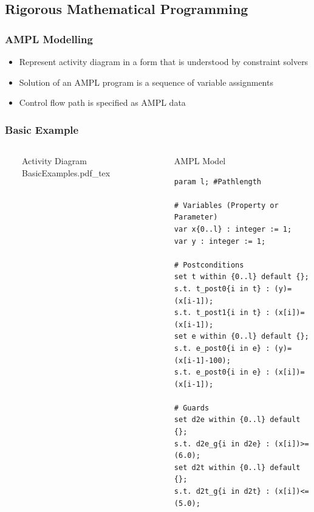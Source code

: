 \documentclass{beamer}
\begin{document}
\subsection{Rigorous Mathematical Programming}
\begin{frame}
\frametitle{AMPL Modelling \cite{AMPL}}
\begin{itemize}
  \item Represent activity diagram in a form that is understood by constraint solvers
  \item Solution of an AMPL program is a sequence of variable assignments
  \item Control flow path is specified as AMPL data
\end{itemize}
\end{frame}
\begin{frame}[fragile]
\frametitle{Basic Example}
\begin{columns}
  \ 
	\begin{block}{Activity Diagram} 
	\def\svgwidth{\textwidth}
	\scriptsize
	{BasicExamples.pdf_tex}
	\end{block} 
\column{.56\textwidth} \ 
	\begin{block}{AMPL Model} 
		\begin{lstlisting}[basicstyle=\ttfamily\scriptsize,language=ampl]
param l; #Pathlength

# Variables (Property or Parameter)
var x{0..l} : integer := 1;
var y : integer := 1;

# Postconditions
set t within {0..l} default {};
s.t. t_post0{i in t} : (y)=(x[i-1]);
s.t. t_post1{i in t} : (x[i])=(x[i-1]);
set e within {0..l} default {};
s.t. e_post0{i in e} : (y)=(x[i-1]-100);
s.t. e_post0{i in e} : (x[i])=(x[i-1]);

# Guards
set d2e within {0..l} default {};
s.t. d2e_g{i in d2e} : (x[i])>=(6.0);
set d2t within {0..l} default {};
s.t. d2t_g{i in d2t} : (x[i])<=(5.0);
\end{lstlisting}
	\end{block} 
\end{columns}
\end{frame}

\end{document}
